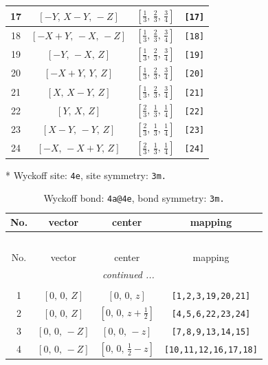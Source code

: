 \documentclass[fleqn,8pt]{jsarticle}
\begin{document}
\begin{longtable}{cccc}
17 & $\left[ - Y,\, X - Y,\, - Z \right]$ & $\left[ \frac{1}{3},\, \frac{2}{3},\, \frac{3}{4} \right]$ & {\tt [17]} \\ \hline
18 & $\left[ - X + Y,\, - X,\, - Z \right]$ & $\left[ \frac{1}{3},\, \frac{2}{3},\, \frac{3}{4} \right]$ & {\tt [18]} \\ \hline
19 & $\left[ - Y,\, - X,\, Z \right]$ & $\left[ \frac{1}{3},\, \frac{2}{3},\, \frac{3}{4} \right]$ & {\tt [19]} \\ \hline
20 & $\left[ - X + Y,\, Y,\, Z \right]$ & $\left[ \frac{1}{3},\, \frac{2}{3},\, \frac{3}{4} \right]$ & {\tt [20]} \\ \hline
21 & $\left[ X,\, X - Y,\, Z \right]$ & $\left[ \frac{1}{3},\, \frac{2}{3},\, \frac{3}{4} \right]$ & {\tt [21]} \\ \hline
22 & $\left[ Y,\, X,\, Z \right]$ & $\left[ \frac{2}{3},\, \frac{1}{3},\, \frac{1}{4} \right]$ & {\tt [22]} \\ \hline
23 & $\left[ X - Y,\, - Y,\, Z \right]$ & $\left[ \frac{2}{3},\, \frac{1}{3},\, \frac{1}{4} \right]$ & {\tt [23]} \\ \hline
24 & $\left[ - X,\, - X + Y,\, Z \right]$ & $\left[ \frac{2}{3},\, \frac{1}{3},\, \frac{1}{4} \right]$ & {\tt [24]} \\
\end{longtable}
* Wyckoff site: {\tt 4e}, site symmetry: {\tt 3m.}
\renewcommand{\arraystretch}{1.2}
\begin{longtable}{cccc}
\caption{Wyckoff bond: {\tt 4a@4e}, bond symmetry: {\tt 3m.}}
 \\
 \hline \hline
No. & vector & center & mapping \\ \hline \endfirsthead

\multicolumn{3}{l}{\tablename\ \thetable{}} \\
 \hline \hline
No. & vector & center & mapping \\ \hline \endhead

 \hline \hline
\multicolumn{3}{r}{\footnotesize\it continued ...} \\ \endfoot

 \hline \hline
\multicolumn{3}{r}{} \\ \endlastfoot

1 & $\left[ 0,\, 0,\, Z \right]$ & $\left[ 0,\, 0,\, z \right]$ & {\tt [1,2,3,19,20,21]} \\ \hline
2 & $\left[ 0,\, 0,\, Z \right]$ & $\left[ 0,\, 0,\, z + \frac{1}{2} \right]$ & {\tt [4,5,6,22,23,24]} \\ \hline
3 & $\left[ 0,\, 0,\, - Z \right]$ & $\left[ 0,\, 0,\, - z \right]$ & {\tt [7,8,9,13,14,15]} \\ \hline
4 & $\left[ 0,\, 0,\, - Z \right]$ & $\left[ 0,\, 0,\, \frac{1}{2} - z \right]$ & {\tt [10,11,12,16,17,18]} \\
\end{longtable}
\end{document}
